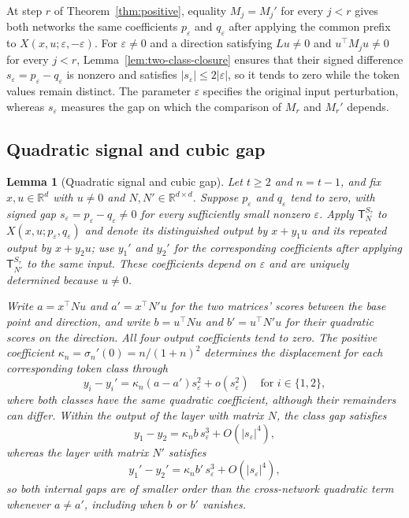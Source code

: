 \documentclass[mlmain]{jmlr}
\newcommand{\T}{\mathsf{T}}
\newtheorem{mylemma}{Lemma}
\begin{document}
At step $r$ of Theorem~\ref{thm:positive}, equality $M_j=M_j'$ for every
$j<r$ gives both networks the same coefficients $p_\varepsilon$ and
$q_\varepsilon$ after applying the common prefix to
$X(x,u;\varepsilon,-\varepsilon)$.  For $\varepsilon\ne0$ and a direction satisfying $Lu\ne0$ and
$u^\top M_j u\ne0$ for every $j<r$, Lemma~\ref{lem:two-class-closure}
ensures that their signed difference $s_\varepsilon=p_\varepsilon-q_\varepsilon$
is nonzero and satisfies $|s_\varepsilon|\le2|\varepsilon|$, so it tends
to zero while the token values remain distinct.  The parameter
$\varepsilon$ specifies the original input perturbation, whereas
$s_\varepsilon$ measures the gap on which the comparison of $M_r$ and
$M_r'$ depends.

\subsection{Quadratic signal and cubic gap}

\begin{mylemma}[Quadratic signal and cubic gap]
\label{lem:quadratic-signal}
Let $t\ge2$ and $n=t-1$, and fix $x,u\in\mathbb R^d$ with $u\ne0$ and
$N,N'\in\mathbb R^{d\times d}$.  Suppose $p_\varepsilon$ and
$q_\varepsilon$ tend to zero, with signed gap
$s_\varepsilon=p_\varepsilon-q_\varepsilon\ne0$ for every sufficiently
small nonzero $\varepsilon$.  Apply $\T_N^{S_\tau}$ to
$X(x,u;p_\varepsilon,q_\varepsilon)$ and denote its distinguished output by
$x+y_1u$ and its repeated output by $x+y_2u$; use $y_1'$ and $y_2'$ for
the corresponding coefficients after applying $\T_{N'}^{S_\tau}$ to the
same input.  These coefficients depend on $\varepsilon$ and are uniquely
determined because $u\ne0$.

Write $a=x^\top Nu$ and $a'=x^\top N'u$ for the two matrices' scores
between the base point and direction, and write $b=u^\top Nu$ and
$b'=u^\top N'u$ for their quadratic scores on the direction.  All four
output coefficients tend to zero.  The positive coefficient
$\kappa_n=\sigma_n'(0)=n/(1+n)^2$ determines the displacement for each
corresponding token class through
\begin{equation}
 y_i-y_i'=\kappa_n(a-a')s_\varepsilon^2+o(s_\varepsilon^2)
 \quad\text{for }i\in\{1,2\},
 \label{eq:quadratic-signal-limit}
\end{equation}
where both classes have the same quadratic coefficient, although their
remainders can differ.  Within the output of the layer with matrix $N$, the
class gap satisfies
\begin{equation}
 y_1-y_2=\kappa_n b\,s_\varepsilon^3+O(|s_\varepsilon|^4),
 \label{eq:quantitative-cubic-gap}
\end{equation}
whereas the layer with matrix $N'$ satisfies
\begin{equation}
 y_1'-y_2'=\kappa_n b'\,s_\varepsilon^3+O(|s_\varepsilon|^4),
 \label{eq:cubic-gap-primed-limit-proof}
\end{equation}
so both internal gaps are of smaller order than the cross-network
quadratic term whenever $a\ne a'$, including when $b$ or $b'$ vanishes.
\end{mylemma}
\end{document}
